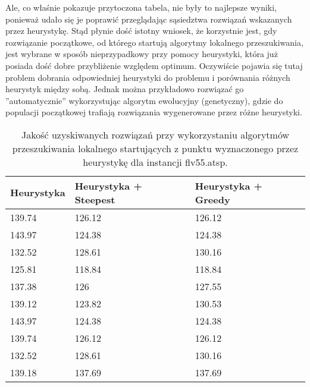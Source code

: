 Ale, co właśnie pokazuje przytoczona tabela, nie były to najlepsze wyniki, ponieważ udało się je poprawić przeglądając sąsiedztwa rozwiązań wskazanych przez heurystykę. Stąd płynie dość istotny wniosek, że korzystnie jest, gdy rozwiązanie początkowe, od którego startują algorytmy lokalnego przeszukiwania, jest wybrane w sposób nieprzypadkowy przy pomocy heurystyki, która już posiada dość dobre przybliżenie względem optimum. Oczywiście pojawia się tutaj problem dobrania odpowiedniej heurystyki do problemu i porównania różnych heurystyk między sobą. Jednak można przykładowo rozwiązać go ''automatycznie'' wykorzystując algorytm ewolucyjny (genetyczny), gdzie do populacji początkowej trafiają rozwiązania wygenerowane przez różne heurystyki.

\begin{table}[h!]
	\centering
       \begin{tabular}{|l|l|l|}
        \hline
		Heurystyka & Heurystyka + Steepest & Heurystyka + Greedy \\
		\hline
		139.74 & 126.12 & 126.12 \\
		143.97 & 124.38 & 124.38 \\
		132.52 & 128.61 & 130.16 \\
		125.81 & 118.84 & 118.84 \\
		137.38 & 126 & 127.55 \\
		139.12 & 123.82 & 130.53 \\
		143.97 & 124.38 & 124.38 \\
		139.74 & 126.12 & 126.12 \\
		132.52 & 128.61 & 130.16 \\
		139.18 & 137.69 & 137.69 \\
		\hline
		\end{tabular}
		\caption{Jakość uzyskiwanych rozwiązań przy wykorzystaniu algorytmów przeszukiwania lokalnego startujących z punktu wyznaczonego przez heurystykę dla instancji flv55.atsp.}
		\label{tab:heur_local}
\end{table}